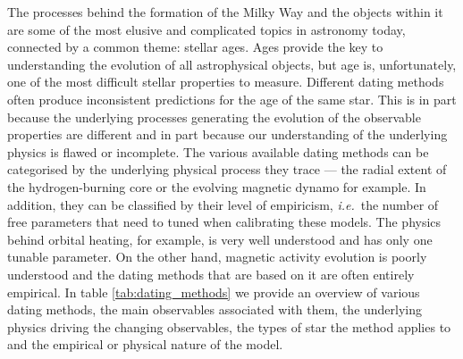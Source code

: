 \documentclass[useAMS, usenatbib, preprint, 12pt]{aastex}
\newcommand{\ie}{{\it i.e.}}
\begin{document}
The processes behind the formation of the Milky Way and the objects within it
are some of the most elusive and complicated topics in astronomy today,
connected by a common theme: stellar ages.
Ages provide the key to understanding the evolution of all astrophysical
objects, but age is, unfortunately, one of the most difficult stellar
properties to measure.
Different dating methods often produce inconsistent predictions for the age of
the same star.
This is in part because the underlying processes generating the evolution of
the observable properties are different and in part because our understanding
of the underlying physics is flawed or incomplete.
The various available dating methods can be categorised by the underlying
physical process they trace --- the radial extent of the hydrogen-burning core
or the evolving magnetic dynamo for example.
In addition, they can be classified by their level of empiricism, \ie\ the
number of free parameters that need to tuned when calibrating these models.
The physics behind orbital heating, for example, is very well understood and
has only one tunable parameter.
On the other hand, magnetic activity evolution is poorly understood and the
dating methods that are based on it are often entirely empirical.
In table \ref{tab:dating_methods} we provide an overview of various dating
methods, the main observables associated with them, the underlying physics
driving the changing observables, the types of star the method applies to and
the empirical or physical nature of the model.
\end{document}

